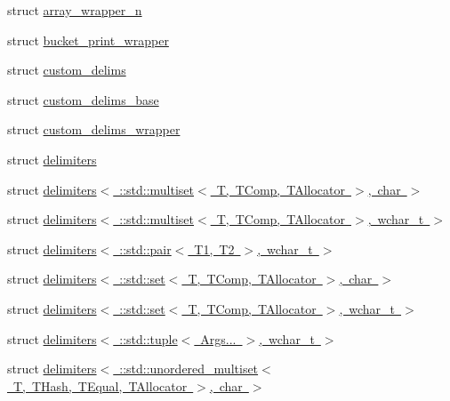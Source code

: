 \begin{DoxyCompactItemize}
\item 
struct \mbox{\hyperlink{structutils_1_1array__wrapper__n}{array\+\_\+wrapper\+\_\+n}}
\item 
struct \mbox{\hyperlink{structutils_1_1bucket__print__wrapper}{bucket\+\_\+print\+\_\+wrapper}}
\item 
struct \mbox{\hyperlink{structutils_1_1custom__delims}{custom\+\_\+delims}}
\item 
struct \mbox{\hyperlink{structutils_1_1custom__delims__base}{custom\+\_\+delims\+\_\+base}}
\item 
struct \mbox{\hyperlink{structutils_1_1custom__delims__wrapper}{custom\+\_\+delims\+\_\+wrapper}}
\item 
struct \mbox{\hyperlink{structutils_1_1delimiters}{delimiters}}
\item 
struct \mbox{\hyperlink{structutils_1_1delimiters_3_01_1_1std_1_1multiset_3_01_t_00_01_t_comp_00_01_t_allocator_01_4_00_01char_01_4}{delimiters$<$ \+::std\+::multiset$<$ T, T\+Comp, T\+Allocator $>$, char $>$}}
\item 
struct \mbox{\hyperlink{structutils_1_1delimiters_3_01_1_1std_1_1multiset_3_01_t_00_01_t_comp_00_01_t_allocator_01_4_00_01wchar__t_01_4}{delimiters$<$ \+::std\+::multiset$<$ T, T\+Comp, T\+Allocator $>$, wchar\+\_\+t $>$}}
\item 
struct \mbox{\hyperlink{structutils_1_1delimiters_3_01_1_1std_1_1pair_3_01_t1_00_01_t2_01_4_00_01wchar__t_01_4}{delimiters$<$ \+::std\+::pair$<$ T1, T2 $>$, wchar\+\_\+t $>$}}
\item 
struct \mbox{\hyperlink{structutils_1_1delimiters_3_01_1_1std_1_1set_3_01_t_00_01_t_comp_00_01_t_allocator_01_4_00_01char_01_4}{delimiters$<$ \+::std\+::set$<$ T, T\+Comp, T\+Allocator $>$, char $>$}}
\item 
struct \mbox{\hyperlink{structutils_1_1delimiters_3_01_1_1std_1_1set_3_01_t_00_01_t_comp_00_01_t_allocator_01_4_00_01wchar__t_01_4}{delimiters$<$ \+::std\+::set$<$ T, T\+Comp, T\+Allocator $>$, wchar\+\_\+t $>$}}
\item 
struct \mbox{\hyperlink{structutils_1_1delimiters_3_01_1_1std_1_1tuple_3_01_args_8_8_8_01_4_00_01wchar__t_01_4}{delimiters$<$ \+::std\+::tuple$<$ Args... $>$, wchar\+\_\+t $>$}}
\item 
struct \mbox{\hyperlink{structutils_1_1delimiters_3_01_1_1std_1_1unordered__multiset_3_01_t_00_01_t_hash_00_01_t_equal_00bd7241f6d7fb529728590d65babd7b5}{delimiters$<$ \+::std\+::unordered\+\_\+multiset$<$ T, T\+Hash, T\+Equal, T\+Allocator $>$, char $>$}}

\end{DoxyCompactItemize}
